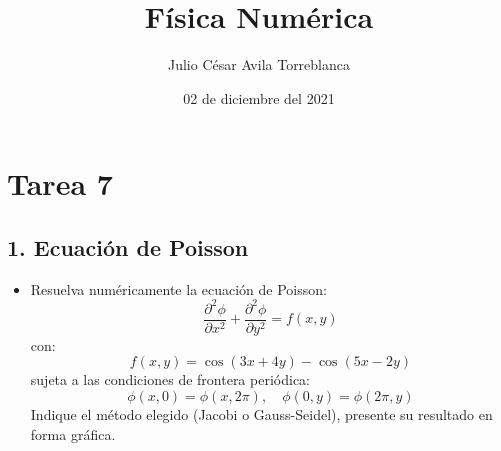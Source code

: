 \documentclass[11pt]{article}
\title{Física Numérica}
\author{Julio César Avila Torreblanca}
\date{02 de diciembre del 2021}
\begin{document}
	\maketitle
	
	\section*{Tarea 7}
	\subsection*{\textbf{1. Ecuación de Poisson}}
	\begin{itemize}
		\item Resuelva numéricamente la ecuación de Poisson:
			$$\frac{\partial^2 \phi}{\partial x^2} + \frac{\partial^2 \phi}{\partial y^2} = f(x,y)$$
			con:
			$$f(x,y) = \cos(3x + 4y) - \cos(5x - 2y)$$
			sujeta a las condiciones de frontera periódica:
			$$\phi (x, 0) = \phi (x,2\pi),\quad \phi (0,y) = \phi(2\pi,y)$$
			Indique el método elegido (Jacobi o Gauss-Seidel), presente su resultado en forma gráfica.
	\end{itemize}
	
\end{document}

